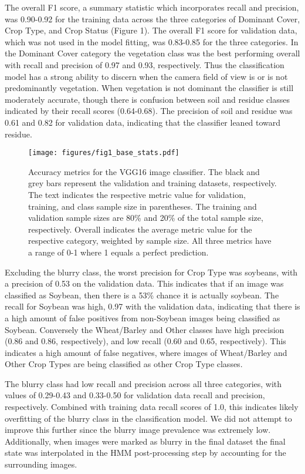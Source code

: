 \documentclass{article}
\begin{document}
The overall F1 score, a summary statistic which incorporates recall and precision, was 0.90-0.92 for the training data across the three categories of Dominant Cover, Crop Type, and Crop Status (Figure 1). The overall F1 score for validation data, which was not used in the model fitting, was 0.83-0.85 for the three categories. In the Dominant Cover category the vegetation class was the best performing overall with recall and precision of 0.97 and 0.93, respectively. Thus the classification model has a strong ability to discern when the camera field of view is or is not predominantly vegetation. When vegetation is not dominant the classifier is still moderately accurate, though there is confusion between soil and residue classes indicated by their recall scores (0.64-0.68). The precision of soil and residue was 0.61 and 0.82 for validation data, indicating that the classifier leaned toward residue.

\begin{figure}[!ht]
    \centering
    \texttt{[image: figures/fig1\_base\_stats.pdf]}
    \caption{Accuracy metrics for the VGG16 image classifier. The black and grey bars represent the validation and training datasets, respectively. The text indicates the respective metric value for validation, training, and class sample size in parentheses. The training and validation sample sizes are 80\% and 20\% of the total sample size, respectively. Overall indicates the average metric value for the respective category, weighted by sample size. All three metrics have a range of 0-1 where 1 equals a perfect prediction.}
    \label{fig1}
\end{figure}

Excluding the blurry class, the worst precision for Crop Type was soybeans, with a precision of 0.53 on the validation data. This indicates that if an image was classified as Soybean, then there is a 53\% chance it is actually soybean. The recall for Soybean was high, 0.97 with the validation data, indicating that there is a high amount of false positives from non-Soybean images being classified as Soybean. Conversely the Wheat/Barley and Other classes have high precision (0.86 and 0.86, respectively), and low recall (0.60 and 0.65, respectively). This indicates a high amount of false negatives, where images of Wheat/Barley and Other Crop Types are being classified as other Crop Type classes. 

The blurry class had low recall and precision across all three categories, with values of 0.29-0.43 and 0.33-0.50 for validation data recall and precision, respectively. Combined with training data recall scores of 1.0, this indicates likely overfitting of the blurry class in the classification model. We did not attempt to improve this further since the blurry image prevalence was extremely low. Additionally, when images were marked as blurry in the final dataset the final state was interpolated in the HMM post-processing step by accounting for the surrounding images.
\end{document}
